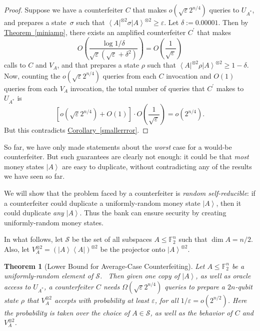 \documentclass[10pt]{article}
\newtheorem{theorem}{Theorem}[section]
\theoremstyle{definition}
\numberwithin{equation}{section}
\newcommand{\expref}[2]{\texorpdfstring{\hyperref[#2]{#1~\ref{#2}}}{#1~\ref{#2}}}
\begin{document}
\begin{proof}
Suppose we have a counterfeiter $C$ that makes $o\left(  \sqrt{\varepsilon
}2^{n/4}\right)  $ queries to $U_{A^{\ast}}$, and prepares a state\ $\sigma
$ such that $\left\langle A\right\vert ^{\otimes2}\sigma\left\vert
A\right\rangle ^{\otimes2}\geq\varepsilon$. Let $\delta:=0.00001$. Then by
\expref{Theorem}{miniamp}, there exists an amplified counterfeiter $C^{\prime}%
$ that makes%
\[
O\left(  \frac{\log1/\delta}{\sqrt{\varepsilon}\left(  \sqrt{\varepsilon
}+\delta^{2}\right)  }\right)  =O\left(  \frac{1}{\sqrt{\varepsilon}}\right)
\]
calls to $C$ and $V_{A}$, and that prepares a state $\rho$ such that
$\left\langle A\right\vert ^{\otimes2}\rho\left\vert A\right\rangle
^{\otimes2}\geq1-\delta$. Now, counting the $o\left(  \sqrt{\varepsilon
}2^{n/4}\right)  $ queries from each $C$ invocation and $O\left(  1\right)
$ queries from each $V_{A}$ invocation, the total number of queries that
$C^{\prime}$ makes to $U_{A^{\ast}}$ is%
\[
\left[  o\left(  \sqrt{\varepsilon}2^{n/4}\right)  +O\left(  1\right)
\right]  \cdot O\left(  \frac{1}{\sqrt{\varepsilon}}\right)  =o\left(
2^{n/4}\right)  .
\]
But this contradicts \expref{Corollary}{smallerrror}.
\end{proof}

So far, we have only made statements about the \emph{worst} case for a
would-be counterfeiter. But such guarantees are clearly not enough: it could
be that \emph{most} money states $\left\vert A\right\rangle $ are easy to
duplicate, without contradicting any of the results we have seen so far.

We will show that the problem faced by a counterfeiter is \emph{random
self-reducible}: if a counterfeiter could duplicate a uniformly-random money
state $\left\vert A\right\rangle $, then it could duplicate \emph{any}
$\left\vert A\right\rangle $. Thus the bank can ensure security by creating
uniformly-random money states.

In what follows, let $\mathcal{S}$ be the set of all subspaces $A\leq
\mathbb{F}_{2}^{n}$ such that $\dim A=n/2$. Also, let $V_{A}^{\otimes
2}=\left(  \left\vert A\right\rangle \left\langle A\right\vert \right)
^{\otimes2}$ be the projector onto $\left\vert A\right\rangle ^{\otimes2}$.

\begin{theorem}
[Lower Bound for Average-Case Counterfeiting]\label{averagecase}Let
$A\leq\mathbb{F}_{2}^{n}$ be a uniformly-random element of $\mathcal{S}$.
\ Then given one copy of $\left\vert A\right\rangle $, as well as oracle
access to $U_{A^{\ast}}$, a counterfeiter $C$ needs $\Omega\left(
\sqrt{\varepsilon}2^{n/4}\right)  $ queries to prepare a $2n$-qubit state
$\rho$ that $V_{A}^{\otimes2}$ accepts with probability at least
$\varepsilon$, for all $1/\varepsilon=o\left(  2^{n/2}\right)  $. Here the
probability is taken over the choice of $A\in\mathcal{S}$, as well as the
behavior of $C$ and $V_{A}^{\otimes2}$.
\end{theorem}
\end{document}
